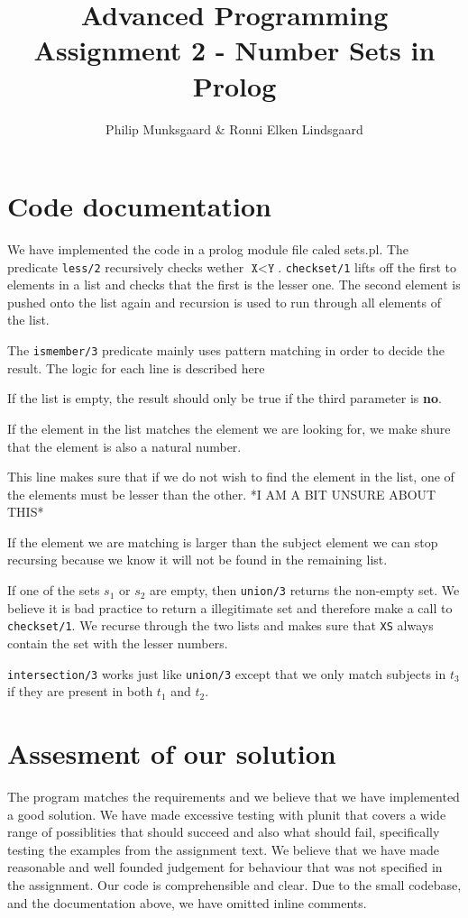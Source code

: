 \documentclass{article}
\title{Advanced Programming Assignment 2 - Number Sets in Prolog}
\author{Philip Munksgaard \& Ronni Elken Lindsgaard}
\newcommand{\prolog}[1]{\texttt{#1}}
\newcommand{\direction}[1]{\textbf{#1}}
\begin{document}
\maketitle
\section{Code documentation}
We have implemented the code in a prolog module file caled sets.pl. The
predicate \prolog{less/2} recursively checks wether $\prolog{X} < \prolog{Y}$.
\prolog{checkset/1} lifts off the first to elements in a list and checks that
the first is the lesser one. The second element is pushed onto the list again
and recursion is used to run through all elements of the list. 

The \prolog{ismember/3} predicate mainly uses pattern matching in order to
decide the result. The logic for each line is described here
\begin{description}
  \item If the list is empty, the result should only be true if the third
    parameter is \direction{no}.
  \item If the element in the list matches the element we are looking for, we
    make shure that the element is also a natural number.
  \item This line makes sure that if we do not wish to find the element in the
    list, one of the elements must be lesser than the other. *I AM A BIT UNSURE
    ABOUT THIS*
  \item If the element we are matching is larger than the subject element we can
    stop recursing because we know it will not be found in the remaining list.
\end{description}

If one of the sets $s_1$ or $s_2$ are empty, then \prolog{union/3} returns the
non-empty set. We believe it is bad practice to return a illegitimate set and
therefore make a call to \prolog{checkset/1}.
We recurse through the two lists and makes sure that \prolog{XS} always contain
the set with the lesser numbers. 

\prolog{intersection/3} works just like \prolog{union/3} except that we only
match subjects in $t_3$ if they are present in both $t_1$ and $t_2$.

\section{Assesment of our solution}
The program matches the requirements and we believe that we have implemented a
good solution. We have made excessive testing with plunit that covers a wide
range of possiblities that should succeed and also what should fail,
specifically testing the examples from the assignment text. We believe
that we have made reasonable and well founded judgement for behaviour that was not
specified in the assignment.
Our code is comprehensible and clear. Due to the small codebase, and the
documentation above, we have omitted inline comments.
\end{document}
